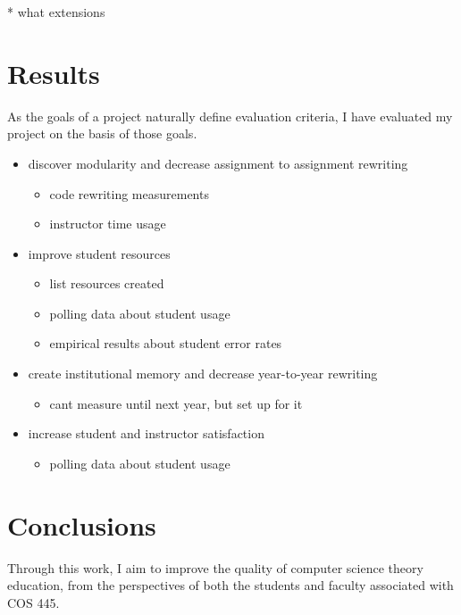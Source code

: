 \documentclass[pageno]{jpaper}
\begin{document}
* what extensions

\section*{Results}
As the goals of a project naturally define evaluation criteria, I have evaluated my project on the basis of those goals.

\begin{itemize}
\item discover modularity and decrease assignment to assignment rewriting
  \begin{itemize}
  \item code rewriting measurements
  \item instructor time usage
  \end{itemize}
\item improve student resources
  \begin{itemize}
  \item list resources created
  \item polling data about student usage
  \item empirical results about student error rates
  \end{itemize}
\item create institutional memory and decrease year-to-year rewriting
  \begin{itemize}
  \item cant measure until next year, but set up for it
  \end{itemize}
\item increase student and instructor satisfaction
  \begin{itemize}
  \item polling data about student usage
  \end{itemize}
\end{itemize}


\section*{Conclusions}
Through this work, I aim to improve the quality of computer science theory education, from the perspectives of both the students and faculty associated with COS 445.
\end{document}
